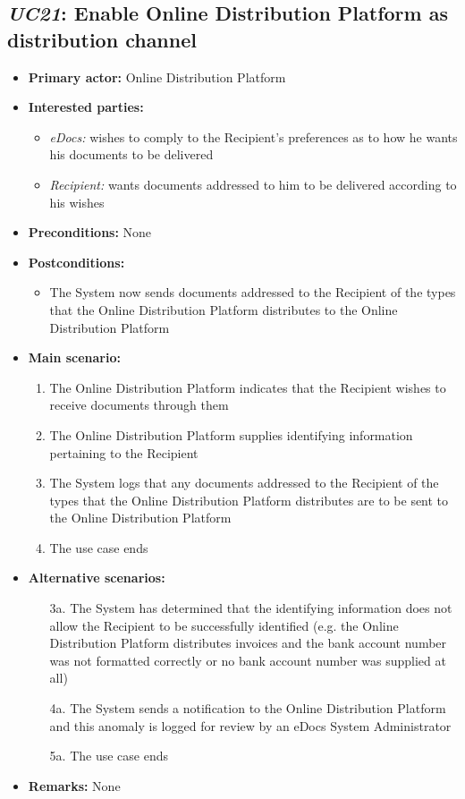 \documentclass[a4paper,10pt]{article}
\begin{document}
\subsection{\emph{UC21}: Enable Online Distribution Platform as distribution channel}
\begin{itemize}
	\item \textbf{Primary actor:} Online Distribution Platform
	\item \textbf{Interested parties:} 
	\begin{itemize}
		\item \textit{eDocs:} wishes to comply to the Recipient's preferences as to how he wants his documents to be delivered
		\item \textit{Recipient:} wants documents addressed to him to be delivered according to his wishes
	\end{itemize}
	
	\item \textbf{Preconditions:}
	None
	
	\item \textbf{Postconditions:}
	\begin{itemize}
		\item The System now sends documents addressed to the Recipient of the types that the Online Distribution Platform distributes to the Online Distribution Platform
	\end{itemize}
	
	\item \textbf{Main scenario:} 
	\begin{enumerate}
		\item The Online Distribution Platform indicates that the Recipient wishes to receive documents through them
		\item The Online Distribution Platform supplies identifying information pertaining to the Recipient
		\item The System logs that any documents addressed to the Recipient of the types that the Online Distribution Platform distributes are to be sent to the Online Distribution Platform
		\item The use case ends
	\end{enumerate}
	
	\item \textbf{Alternative scenarios:} 
	\begin{enumerate}
		\item [3a.] The System has determined that the identifying information does not allow the Recipient to be successfully identified (e.g. the Online Distribution Platform distributes invoices and the bank account number was not formatted correctly or no bank account number was supplied at all)
		\item [4a.] The System sends a notification to the Online Distribution Platform and this anomaly is logged for review by an eDocs System Administrator
		\item [5a.] The use case ends
	\end{enumerate}
	
	\item \textbf{Remarks:}
	None
\end{itemize}
\end{document}
